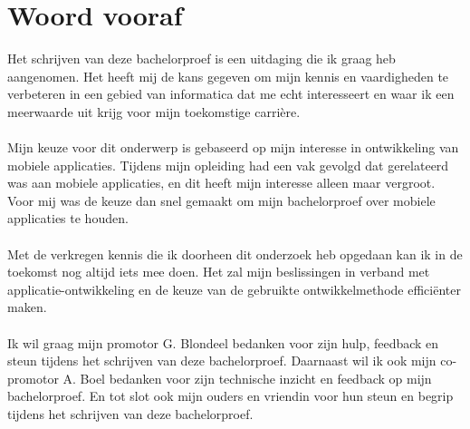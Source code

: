 
\chapter{Woord vooraf}
\label{ch:voorwoord}


Het schrijven van deze bachelorproef is een uitdaging die ik graag heb aangenomen. 
Het heeft mij de kans gegeven om mijn kennis en vaardigheden te verbeteren in een 
gebied van informatica dat me echt interesseert en waar ik een meerwaarde uit krijg
voor mijn toekomstige carrière.
\\\\
Mijn keuze voor dit onderwerp is gebaseerd op mijn interesse in ontwikkeling 
van mobiele applicaties. Tijdens mijn opleiding had een vak gevolgd dat gerelateerd was 
aan mobiele applicaties, en dit heeft mijn interesse alleen maar vergroot. Voor mij 
was de keuze dan snel gemaakt om mijn bachelorproef over mobiele applicaties te houden.
\\\\
Met de verkregen kennis die ik doorheen dit onderzoek heb opgedaan kan ik in de toekomst
nog altijd iets mee doen. Het zal mijn beslissingen in verband met applicatie-ontwikkeling
en de keuze van de gebruikte ontwikkelmethode efficiënter maken.
\\\\
Ik wil graag mijn promotor G. Blondeel bedanken voor zijn hulp, feedback en steun tijdens het 
schrijven van deze bachelorproef. Daarnaast wil ik ook mijn co-promotor A. Boel bedanken voor 
zijn technische inzicht en feedback op mijn bachelorproef. En tot slot ook mijn ouders en vriendin
voor hun steun en begrip tijdens het schrijven van deze bachelorproef.